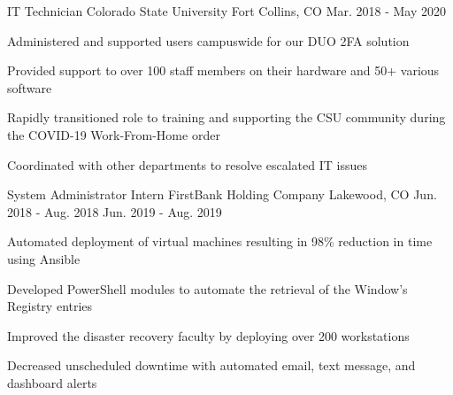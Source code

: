 \begin{cventries}
  \cventry
    {IT Technician} %
    {Colorado State University} %
    {Fort Collins, CO} %
    {Mar. 2018 - May 2020} %
    {
      \begin{cvitems} %
        \item {Administered and supported users campuswide for our DUO 2FA solution}
        \item {Provided support to over 100 staff members on their hardware and 50+ various software}
        \item {Rapidly transitioned role to training and supporting the CSU community during the COVID-19 Work-From-Home order}
        \item {Coordinated with other departments to resolve escalated IT issues}
      \end{cvitems}
    }

  \twodates
    {System Administrator Intern} %
    {FirstBank Holding Company} %
    {Lakewood, CO} %
    {Jun. 2018 - Aug. 2018} %
    {Jun. 2019 - Aug. 2019}
    {
      \begin{cvitems} %
        \item {Automated deployment of virtual machines resulting in 98\% reduction in time using Ansible}
        \item {Developed PowerShell modules to automate the retrieval of the Window’s Registry entries}
        \item {Improved the disaster recovery faculty by deploying over 200 workstations}
        \item {Decreased unscheduled downtime with automated email, text message, and dashboard alerts}
      \end{cvitems}
    }
    

\end{cventries}
